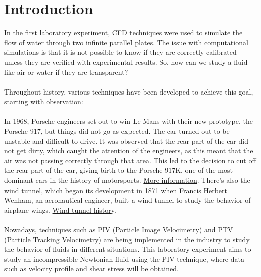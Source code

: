 \documentclass{article} %
\begin{document}

\setcounter{page}{1} %
\section{Introduction}

In the first laboratory experiment, CFD techniques were used to simulate the flow of water through two infinite parallel plates. The issue with computational simulations is that it is not possible to know if they are correctly calibrated unless they are verified with experimental results. So, how can we study a fluid like air or water if they are transparent?
\\ \\
Throughout history, various techniques have been developed to achieve this goal, starting with observation:
\\ \\
In 1968, Porsche engineers set out to win Le Mans with their new prototype, the Porsche 917, but things did not go as expected. The car turned out to be unstable and difficult to drive. It was observed that the rear part of the car did not get dirty, which caught the attention of the engineers, as this meant that the air was not passing correctly through that area. This led to the decision to cut off the rear part of the car, giving birth to the Porsche 917K, one of the most dominant cars in the history of motorsports. \href{https://automedia.revsinstitute.org/1971-porsche-917k}{More information}. There's also the wind tunnel, which began its development in 1871 when Francis Herbert Wenham, an aeronautical engineer, built a wind tunnel to study the behavior of airplane wings. \href{https://www.grc.nasa.gov/www/k-12/WindTunnel/history.html}{Wind tunnel history}.
\\ \\
Nowadays, techniques such as PIV (Particle Image Velocimetry) and PTV (Particle Tracking Velocimetry) are being implemented in the industry to study the behavior of fluids in different situations. 
This laboratory experiment aims to study an incompressible Newtonian fluid using the PIV technique, where data such as velocity profile and shear stress will be obtained.
\end{document}
